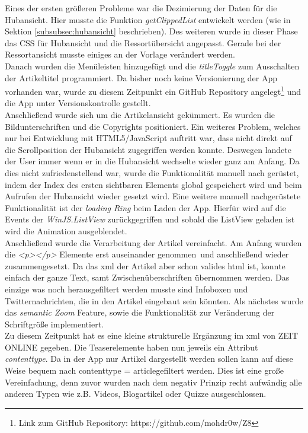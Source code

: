 \documentclass[12pt,a4paper,bibtotoc,abstracton]{scrartcl}
\begin{document}
Eines der ersten größeren Probleme war die Dezimierung der Daten für die Hubansicht. Hier musste die Funktion \textit{getClippedList} entwickelt werden (wie in Sektion \ref{subsubsec:hubansicht} beschrieben). Des weiteren wurde in dieser Phase das CSS für Hubansicht und die Ressortübersicht angepasst. Gerade bei der Ressortansicht musste einiges an der Vorlage verändert werden.\\

Danach wurden die Menüleisten hinzugefügt  und die \textit{titleToggle} zum Ausschalten der Artikeltitel programmiert. Da bisher noch keine Versionierung der App vorhanden war, wurde zu diesem Zeitpunkt ein GitHub Repository angelegt\footnote{Link zum GitHub Repository: https://github.com/mohdr0w/Z8} und die App unter Versionskontrolle gestellt. \\

Anschließend wurde sich um die Artikelansicht gekümmert. Es wurden die Bildunterschriften und die Copyrights positioniert. Ein weiteres Problem, welches nur bei Entwicklung mit HTML5/JavaScript auftritt war, dass nicht direkt auf die Scrollposition der Hubansicht zugegriffen werden konnte. Deswegen landete der User immer wenn er in die Hubansicht wechselte wieder ganz am Anfang. Da dies nicht zufriedenstellend war, wurde die Funktionalität manuell nach gerüstet, indem der Index des ersten sichtbaren Elements global gespeichert wird und beim Aufrufen der Hubansicht wieder gesetzt wird. Eine weitere manuell nachgerüstete Funktionalität ist der \textit{loading Ring} beim Laden der App. Hierfür wird auf die Events der \textit{WinJS.ListView} zurückgegriffen und sobald die ListView geladen ist wird die Animation ausgeblendet.\\

Anschließend wurde die Verarbeitung der Artikel vereinfacht. Am Anfang wurden die \textit{<p></p>} Elemente erst \glqq auseinander genommen\grqq\ und anschließend wieder zusammengesetzt. Da das \ac{xml} der Artikel aber schon valides \ac{html} ist, konnte einfach der ganze Text, samt Zwischenüberschriften übernommen werden. Das einzige was noch herausgefiltert werden musste sind Infoboxen und Twitternachrichten, die in den Artikel eingebaut sein könnten. Als nächstes wurde das \textit{semantic Zoom} Feature, sowie die Funktionalität zur Veränderung der Schriftgröße implementiert.   \\

Zu diesem Zeitpunkt hat es eine kleine strukturelle Ergänzung im \ac{xml} von ZEIT ONLINE gegeben. Die Teaserelemente haben nun jeweils ein Attribut \textit{contenttype}. Da in der App nur Artikel dargestellt werden sollen kann auf diese Weise bequem nach \glqq contenttype = article\grqq gefiltert werden. Dies ist eine große Vereinfachung, denn zuvor wurden nach dem negativ Prinzip recht aufwändig alle anderen Typen wie z.B. Videos, Blogartikel oder Quizze ausgeschlossen.  
\end{document}
